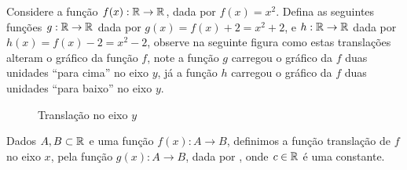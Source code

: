  \begin{exem}
  Considere a função $f(x): \mathbb{R} \to \mathbb{R}$, dada por $f(x)= x^2$. Defina as seguintes funções $g: \mathbb{R} \to \mathbb{R}$ dada por $g(x)= f(x) + 2= x^2 + 2$, e $h: \mathbb{R} \to \mathbb{R}$ dada por $h(x)= f(x) - 2= x^2 - 2$, observe na seguinte figura como estas translações alteram o gráfico da função $f$, note a função $g$ carregou o gráfico da $f$ duas unidades ``para cima'' no eixo $y$, já a função $h$ carregou o gráfico da $f$ duas unidades ``para baixo'' no eixo $y$.

 \begin{figure}[H]
\caption{Translação no eixo $y$}
  \end{figure}

 \end{exem}

  Dados $A, B \subset \mathbb{R}$ e uma função $f(x): A \to B$, definimos a função translação de $f$ no eixo $x$, pela função $g(x): A \to B$, dada por , onde $c \in \mathbb{R}$ é uma constante.


